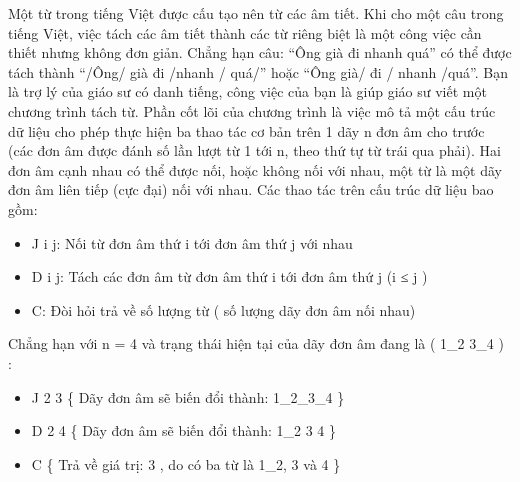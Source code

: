 Một từ trong tiếng Việt được cấu tạo nên từ các âm tiết. Khi cho một câu trong tiếng Việt, việc tách các âm tiết thành các từ riêng biệt là một công việc cần thiết nhưng không đơn giản. Chẳng hạn câu: “Ông già đi nhanh quá” có thể được tách thành “/Ông/ già đi /nhanh / quá/” hoặc “Ông già/ đi / nhanh /quá”. Bạn là trợ lý của giáo sư có danh tiếng, công việc của bạn là giúp giáo sư viết một chương trình tách từ. Phần cốt lõi của chương trình là việc mô tả một cấu trúc dữ liệu cho phép thực hiện ba thao tác cơ bản trên 1 dãy n đơn âm cho trước (các đơn âm được đánh số lần lượt từ 1 tới n, theo thứ tự từ trái qua phải). Hai đơn âm cạnh nhau có thể được nối, hoặc không nối với nhau, một từ là một dãy đơn âm liên tiếp (cực đại) nối với nhau. Các thao tác trên cấu trúc dữ liệu bao gồm:
\begin{itemize}
	\item J i j: Nối từ đơn âm thứ i tới đơn âm thứ j với nhau
	\item D i j: Tách các đơn âm từ đơn âm thứ i tới đơn âm thứ j (i ≤ j )
	\item C: Đòi hỏi trả về số lượng từ ( số lượng dãy đơn âm nối nhau)
\end{itemize}

Chẳng hạn với n = 4 và trạng thái hiện tại của dãy đơn âm đang là ( 1\_2 3\_4 ) :
\begin{itemize}
	\item J 2 3 \{ Dãy đơn âm sẽ biến đổi thành: 1\_2\_3\_4 \}
	\item D 2 4 \{ Dãy đơn âm sẽ biến đổi thành: 1\_2 3 4 \}
	\item C \{ Trả về giá trị: 3 , do có ba từ là 1\_2, 3 và 4 \}
\end{itemize}